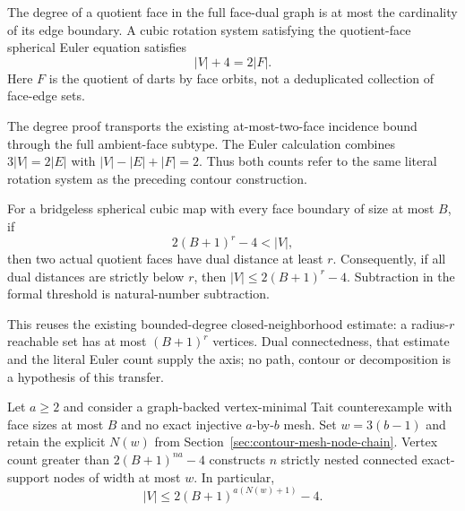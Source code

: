 \begin{theorem}
The degree of a quotient face in the full face-dual graph is at most the
cardinality of its edge boundary.  A cubic rotation system satisfying the
quotient-face spherical Euler equation satisfies
\[
 |V|+4=2|F|.
\]
Here $F$ is the quotient of darts by face orbits, not a deduplicated
collection of face-edge sets.
\end{theorem}

The degree proof transports the existing at-most-two-face incidence bound
through the full ambient-face subtype.  The Euler calculation combines
$3|V|=2|E|$ with $|V|-|E|+|F|=2$.  Thus both counts refer to the same
literal rotation system as the preceding contour construction.

\begin{theorem}
For a bridgeless spherical cubic map with every face boundary of size at
most $B$, if
\[
 2(B+1)^r-4<|V|,
\]
then two actual quotient faces have dual distance at least $r$.
Consequently, if all dual distances are strictly below $r$, then
$|V|\le 2(B+1)^r-4$.  Subtraction in the formal threshold is natural-number
subtraction.
\end{theorem}

This reuses the existing bounded-degree closed-neighborhood estimate:
a radius-$r$ reachable set has at most $(B+1)^r$ vertices.  Dual
connectedness, that estimate and the literal Euler count supply the axis;
no path, contour or decomposition is a hypothesis of this transfer.

\begin{theorem}
Let $a\ge2$ and consider a graph-backed vertex-minimal Tait
counterexample with face sizes at most $B$ and no exact injective
$a$-by-$b$ mesh.  Set $w=3(b-1)$ and retain the explicit $N(w)$ from
Section~\ref{sec:contour-mesh-node-chain}.  Vertex count greater than
$2(B+1)^{na}-4$ constructs $n$ strictly nested connected exact-support
nodes of width at most $w$.  In particular,
\[
 |V|\le 2(B+1)^{a(N(w)+1)}-4.
\]
\end{theorem}

